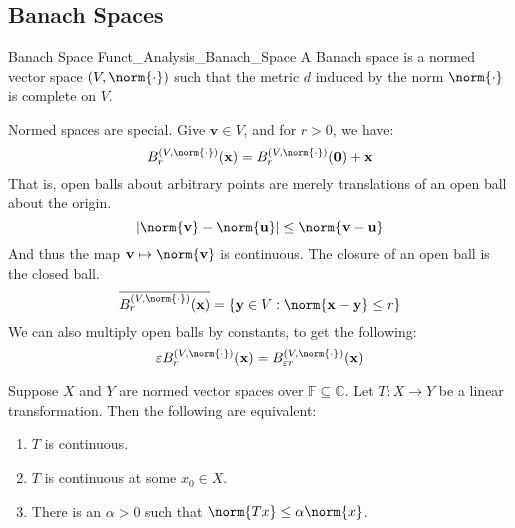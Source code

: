         \subsection{Banach Spaces}
        \begin{ldefinition}{Banach Space}
              {Funct_Analysis_Banach_Space}
            A Banach space is a normed vector space
            $(V,\norm{\cdot})$ such that the metric $d$ induced by
            the norm $\norm{\cdot}$ is complete on $V$.
        \end{ldefinition}
        Normed spaces are special. Give $\mathbf{v}\in{V}$, and
        for $r>0$, we have:
        \begin{equation}
            B_{r}^{(V,\norm{\cdot})}(\mathbf{x})=
            B_{r}^{(V,\norm{\cdot})}(\mathbf{0})+\mathbf{x}
        \end{equation}
        That is, open balls about arbitrary points are merely
        translations of an open ball about the origin.
        \begin{equation}
            |\norm{\mathbf{v}}-\norm{\mathbf{u}}|
            \leq\norm{\mathbf{v}-\mathbf{u}}
        \end{equation}
        And thus the map $\mathbf{v}\mapsto\norm{\mathbf{v}}$ is
        continuous. The closure of an open ball is the closed ball.
        \begin{equation}
            \overline{B_{r}^{(V,\norm{\cdot})}(\mathbf{x})}
            =\{\mathbf{y}\in{V}:
                \norm{\mathbf{x}-\mathbf{y}}\leq{r}\}
        \end{equation}
        We can also multiply open balls by constants, to get
        the following:
        \begin{equation}
            \varepsilon{B}_{r}^{(V,\norm{\cdot})}(\mathbf{x})=
            B_{\varepsilon{r}}^{(V,\norm{\cdot})}(\mathbf{x})
        \end{equation}
        \begin{theorem}
            Suppose $X$ and $Y$ are normed vector spaces over
            $\mathbb{F}\subseteq\mathbb{C}$. Let $T:X\rightarrow{Y}$
            be a linear transformation. Then the following
            are equivalent:
            \begin{enumerate}
                \item $T$ is continuous.
                \item $T$ is continuous at some $x_{0}\in{X}$.
                \item There is an $\alpha>0$ such that
                      $\norm{Tx}\leq\alpha\norm{x}$.
            \end{enumerate}
        \end{theorem}
